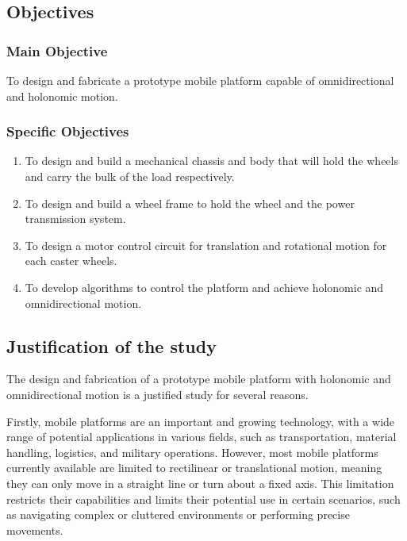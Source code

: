 \subsection{Objectives}
\label{sec:objectives}
\subsubsection{Main Objective}
To design and fabricate a prototype mobile platform capable of omnidirectional and holonomic motion.

\subsubsection{Specific Objectives}

\begin{enumerate}
    \item To design and build a mechanical chassis and body that will hold the wheels and carry the bulk of the load respectively.
    \item To design and build a wheel frame to hold the wheel and the power transmission system.
    \item To design a motor control circuit for translation and rotational motion for each caster wheels.
    \item To develop algorithms to control the platform and achieve holonomic and omnidirectional motion.

\end{enumerate}


\subsection{Justification of the study}

The design and fabrication of a prototype mobile platform with holonomic and omnidirectional motion is a justified study for several reasons.

Firstly, mobile platforms are an important and growing technology, with a wide range of potential applications in various fields, such as transportation, material handling, logistics, and military operations. However, most mobile platforms currently available are limited to rectilinear or translational motion, meaning they can only move in a straight line or turn about a fixed axis. This limitation restricts their capabilities and limits their potential use in certain scenarios, such as navigating complex or cluttered environments or performing precise movements.

